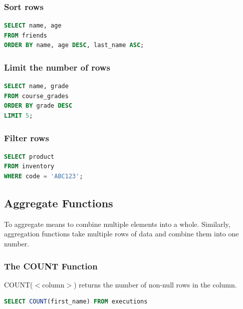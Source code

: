 \documentclass{article}
\begin{document}
\subsubsection{Sort rows}

\vspace{8pt} \begin{lstlisting}[language=SQL]
SELECT name, age
FROM friends
ORDER BY name, age DESC, last_name ASC;
\end{lstlisting} \vspace{8pt}

\subsubsection{Limit the number of rows}

\vspace{8pt} \begin{lstlisting}[language=SQL]
SELECT name, grade
FROM course_grades
ORDER BY grade DESC
LIMIT 5;
\end{lstlisting} \vspace{8pt}

\subsubsection{Filter rows}

\vspace{8pt} \begin{lstlisting}[language=SQL]
SELECT product
FROM inventory
WHERE code = 'ABC123';
\end{lstlisting} \vspace{8pt}


\subsection{Aggregate Functions }

To aggregate means to combine multiple elements into a whole. Similarly, aggregation functions take multiple rows of data and combine them into one number.

\subsubsection{The COUNT Function}

COUNT($<$column$>$) returns the number of non-null rows in the column.

\vspace{8pt} \begin{lstlisting}[language=SQL]
SELECT COUNT(first_name) FROM executions
\end{lstlisting} \vspace{8pt}
\end{document}
